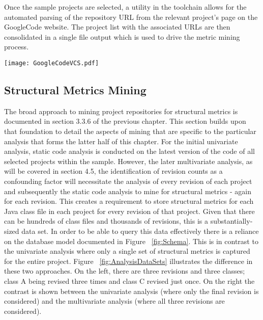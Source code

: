 Once the sample projects are selected, a utility in the toolchain allows for the automated parsing of the repository URL from the relevant project's page on the GoogleCode website. The project list with the associated URLs are then consolidated in a single file output which is used to drive the metric mining process.

\begin{table}
\centering 
{}
\begin{tabular}
 \centering 
 \texttt{[image: GoogleCodeVCS.pdf]}
 \label{tab:GoogleCodeVCS}
\end{tabular}
\end{table}


\subsection{Structural Metrics Mining}
The broad approach to mining project repositories for structural metrics is documented in section 3.3.6 of the previous chapter. This section builds upon that foundation to detail the aspects of mining that are specific to the particular analysis that forms the latter half of this chapter. For the initial univariate analysis, static code analysis is conducted on the latest version of the code of all selected projects within the sample. However, the later multivariate analysis, as will be covered in section 4.5, the identification of revision counts as a confounding factor will necessitate the analysis of every revision of each project and subsequently the static code analysis to mine for structural metrics - again for each revision. This creates a requirement to store structural metrics for each Java class file in each project for every revision of that project. Given that there can be hundreds of class files and thousands of revisions, this is a substantially-sized data set. In order to be able to query this data effectively there is a reliance on the database model documented in Figure ~\ref{fig:Schema}. This is in contrast to the univariate analysis where only a single set of structural metrics is captured for the entire project. Figure ~\ref{fig:AnalysisDataSets} illustrates the difference in these two approaches. On the left, there are three revisions and three classes; class A being revised three times and class C revised just once. On the right the contrast is shown between the univariate analysis (where only the final revision is considered) and the multivariate analysis (where all three revisions are considered).

